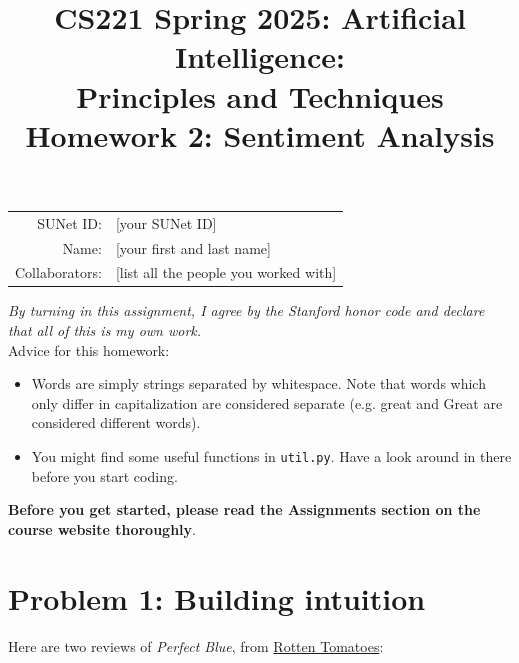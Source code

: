 \documentclass{article}
\title{\textbf{CS221 Spring 2025: Artificial Intelligence:\\ Principles and Techniques} \\Homework 2: Sentiment Analysis}
\date{}
\theoremstyle{case}
\theoremstyle{definition}
\begin{document}
\maketitle

\begin{center}
\begin{tabular}{rl}
SUNet ID: & [your SUNet ID] \\
Name: & [your first and last name] \\
Collaborators: & [list all the people you worked with]
\end{tabular}
\end{center}
\textit{By turning in this assignment, I agree by the Stanford honor code and declare
that all of this is my own work.} \\
\fontsize{12pt}{16pt}\selectfont
Advice for this homework:
\begin{itemize}
    \item Words are simply strings separated by whitespace. Note that words which only differ in capitalization are considered separate (e.g. great and Great are considered different words).
    \item You might find some useful functions in \texttt{util.py}. Have a look around in there before you start coding.
\end{itemize}
\textbf{Before you get started, please read the Assignments section on the course website thoroughly}.


\section*{Problem 1: Building intuition}

Here are two reviews of \textit{Perfect Blue}, from \href{https://www.rottentomatoes.com/}{Rotten Tomatoes}: \newline
\end{document}

